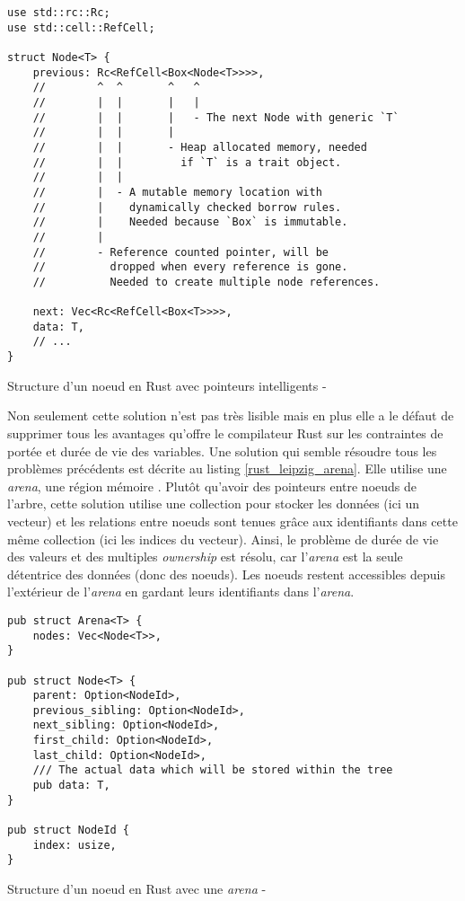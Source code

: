 \begin{code}
    \begin{verbatim}
use std::rc::Rc;
use std::cell::RefCell;

struct Node<T> {
    previous: Rc<RefCell<Box<Node<T>>>>,
    //        ^  ^       ^   ^
    //        |  |       |   |
    //        |  |       |   - The next Node with generic `T`
    //        |  |       |
    //        |  |       - Heap allocated memory, needed
    //        |  |         if `T` is a trait object.
    //        |  |
    //        |  - A mutable memory location with
    //        |    dynamically checked borrow rules.
    //        |    Needed because `Box` is immutable.
    //        |
    //        - Reference counted pointer, will be
    //          dropped when every reference is gone.
    //          Needed to create multiple node references.

    next: Vec<Rc<RefCell<Box<T>>>>,
    data: T,
    // ...
}
    \end{verbatim}
    \caption{Structure d'un noeud en Rust avec pointeurs intelligents - \cite{ref49}}
    \label{node_rust_leipzig}
\end{code}
\bigbreak
Non seulement cette solution n'est pas très lisible mais en plus elle a le défaut de supprimer 
tous les avantages qu'offre le compilateur Rust sur les contraintes de portée et durée de vie 
des variables. Une solution qui semble résoudre tous les problèmes précédents est décrite au 
listing \ref{rust_leipzig_arena}. Elle utilise une \textit{arena}, une région mémoire \cite{ref53}. Plutôt 
qu'avoir des pointeurs entre noeuds de l'arbre, cette solution utilise une collection pour 
stocker les données (ici un vecteur) et les relations entre noeuds sont tenues grâce aux 
identifiants dans cette même collection (ici les indices du vecteur). Ainsi, le problème 
de durée de vie des valeurs et des multiples \textit{ownership} est résolu, car l'\textit{arena}
est la seule détentrice des données (donc des noeuds). Les noeuds restent accessibles depuis 
l'extérieur de l'\textit{arena} en gardant leurs identifiants dans l'\textit{arena}.
\bigbreak
\begin{code}
    \begin{verbatim}
pub struct Arena<T> {
    nodes: Vec<Node<T>>,
}

pub struct Node<T> {
    parent: Option<NodeId>,
    previous_sibling: Option<NodeId>,
    next_sibling: Option<NodeId>,
    first_child: Option<NodeId>,
    last_child: Option<NodeId>,
    /// The actual data which will be stored within the tree
    pub data: T,
}

pub struct NodeId {
    index: usize,
}
    \end{verbatim}
    \caption{Structure d'un noeud en Rust avec une \textit{arena} - \cite{ref49}}
    \label{rust_leipzig_arena}
\end{code}
